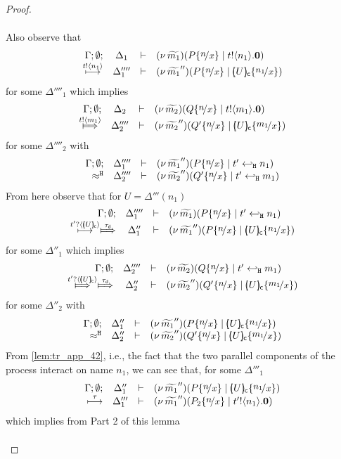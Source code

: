 \begin{proof}
\begin{enumerate}[1.]
\begin{enumerate}[(a)]
\begin{itemize}
\begin{eqnarray}
											\label{lem:tr_app_43}
										\end{eqnarray}
										Also observe that %
										\[
											\mhorel{\Gamma}{\Delta_1}{\newsp{\widetilde{m_1}}{P \subst{n}{x} \Par \bout{t}{n_1} \inact}}
											{ \hby{\bactout{t}{n_1}} }
											{\Delta_1''''}{}{\newsp{\widetilde{m_1}''}{P \subst{n}{x} \Par \omapchar{U} \subst{n_1}{x}}}
										\]
										for some $\Delta''''_1$
										which implies
										\[
											\mhorel{\Gamma}{\Delta_2}{\newsp{\widetilde{m_2}}{Q \subst{n}{x} \Par \bout{t}{m_1} \inact}}
											{ \Hby{\bactout{t}{m_1}} }
											{\Delta_2''''}{}{\newsp{\widetilde{m_2}''}{Q' \subst{n}{x} \Par \omapchar{U} \subst{m_1}{x}}}
										\]
										for some $\Delta''''_2$
										with
										\[
										\mhorel{\Gamma}{\Delta_1''''}{\newsp{\widetilde{m_1}''}{P \subst{n}{x} \Par \htrigger{t'}{n_1}}}
										{\hwb}
										{\Delta_2''''}{}{\newsp{\widetilde{m_2}''}{Q' \subst{n}{x} \Par \htrigger{t'}{m_1}}}
										\]
										From here observe that for $U = \Delta'''(n_1)$
										\[
										\mhorel{\Gamma}{\Delta_1''''}{\newsp{\widetilde{m_1}}{P \subst{n}{x} \Par \htrigger{t'}{n_1}}}
										{  \hby{\bactinp{t'}{\omapchar{U}}} \Hby{\dtau} }
										{\Delta_1''}{}{\newsp{\widetilde{m_1}''}{P \subst{n}{x} \Par \omapchar{U} \subst{n_1}{x}}}
										\]
										for some $\Delta''_1$
										which implies
										\[
										\mhorel{\Gamma}{\Delta_2''''}{\newsp{\widetilde{m_2}}{Q \subst{n}{x} \Par \htrigger{t'}{m_1}}}
										{ \Hby{\bactinp{t'}{\omapchar{U}}} \Hby{\dtau} }
										{\Delta_2''}{}{\newsp{\widetilde{m_2}''}{Q' \subst{n}{x} \Par \omapchar{U} \subst{m_1}{x}}}
										\]
										for some $\Delta''_2$
										with
										\[
											\mhorel{\Gamma}{\Delta_1''}{\newsp{\widetilde{m_1}''}{P \subst{n}{x} \Par \omapchar{U} \subst{n_1}{x}}}
											{\hwb}
											{\Delta_2''}{}{\newsp{\widetilde{m_2}''}{Q' \subst{n}{x} \Par \omapchar{U} \subst{m_1}{x}}}
										\]
										From \eqref{lem:tr_app_42}, i.e., the fact that the two parallel components of the process interact on name $n_1$, we can see that, for some $\Delta'''_1$
										\[
											\mhorel{\Gamma}{\Delta_1''}{\newsp{\widetilde{m_1}''}{P \subst{n}{x} \Par \omapchar{U} \subst{n_1}{x}}}
											{ \hby{\tau} }
											{\Delta_1'''}{}{\newsp{\widetilde{m_1}''}{P_2 \subst{n}{x} \Par \bout{t'}{n_1} \inact}}
										\]
										which implies from Part 2 of this lemma
										\begin{eqnarray}

\end{eqnarray}
\end{itemize}
\end{enumerate}
\end{enumerate}
\end{proof}
